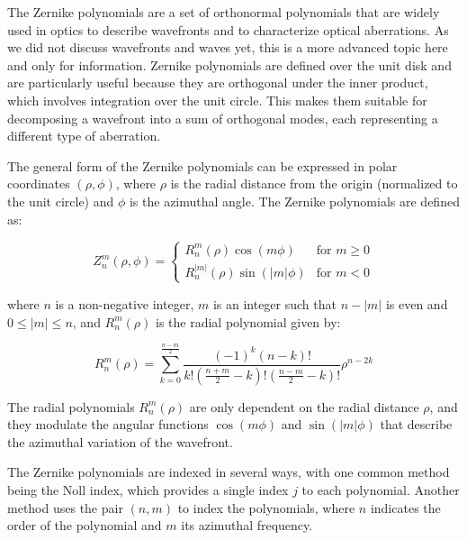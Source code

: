 \documentclass[
  a4paper,
]{book}
\begin{document}
\begin{tcolorbox}[enhanced jigsaw, breakable, toptitle=1mm, bottomrule=.15mm, colbacktitle=quarto-callout-note-color!10!white, title=\textcolor{quarto-callout-note-color}{\faInfo}\hspace{0.5em}{Aberration Characterization and Zernike Polynomials}, arc=.35mm, rightrule=.15mm, bottomtitle=1mm, opacityback=0, toprule=.15mm, coltitle=black, leftrule=.75mm, opacitybacktitle=0.6, colback=white, left=2mm, titlerule=0mm, colframe=quarto-callout-note-color-frame]

The Zernike polynomials are a set of orthonormal polynomials that are
widely used in optics to describe wavefronts and to characterize optical
aberrations. As we did not discuss wavefronts and waves yet, this is a
more advanced topic here and only for information. Zernike polynomials
are defined over the unit disk and are particularly useful because they
are orthogonal under the inner product, which involves integration over
the unit circle. This makes them suitable for decomposing a wavefront
into a sum of orthogonal modes, each representing a different type of
aberration.

The general form of the Zernike polynomials can be expressed in polar
coordinates \((\rho, \phi)\), where \(\rho\) is the radial distance from
the origin (normalized to the unit circle) and \(\phi\) is the azimuthal
angle. The Zernike polynomials are defined as:

\[
Z_n^m(\rho, \phi) =
\begin{cases}
R_n^m(\rho) \cos(m\phi) & \text{for } m \geq 0 \\
R_n^{|m|}(\rho) \sin(|m|\phi) & \text{for } m < 0
\end{cases}
\]

where \(n\) is a non-negative integer, \(m\) is an integer such that
\(n - |m|\) is even and \(0 \leq |m| \leq n\), and \(R_n^m(\rho)\) is
the radial polynomial given by:

\[
R_n^m(\rho) = \sum_{k=0}^{\frac{n-m}{2}} \frac{(-1)^k (n-k)!}{k! \left(\frac{n+m}{2} - k\right)! \left(\frac{n-m}{2} - k\right)!} \rho^{n-2k}
\]

The radial polynomials \(R_n^m(\rho)\) are only dependent on the radial
distance \(\rho\), and they modulate the angular functions
\(\cos(m\phi)\) and \(\sin(|m|\phi)\) that describe the azimuthal
variation of the wavefront.

The Zernike polynomials are indexed in several ways, with one common
method being the Noll index, which provides a single index \(j\) to each
polynomial. Another method uses the pair \((n, m)\) to index the
polynomials, where \(n\) indicates the order of the polynomial and \(m\)
its azimuthal frequency.


\end{tcolorbox}
\end{document}
